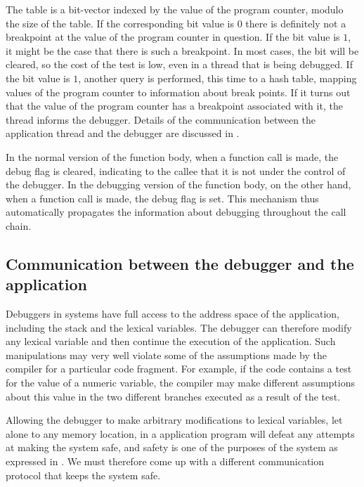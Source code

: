 The table is a bit-vector indexed by the value of the program counter,
modulo the size of the table.  If the corresponding bit value is $0$
there is definitely not a breakpoint at the value of the program
counter in question.  If the bit value is $1$, it might be the case
that there is such a breakpoint.  In most cases, the bit will be
cleared, so the cost of the test is low, even in a thread that is
being debugged.  If the bit value is $1$, another query is performed,
this time to a hash table, mapping values of the program counter to
information about break points.  If it turns out that the value of the
program counter has a breakpoint associated with it, the thread
informs the debugger.  Details of the communication between the
application thread and the debugger are discussed in
.

In the normal version of the function body, when a function call is
made, the debug flag is cleared, indicating to the callee that it is
not under the control of the debugger.  In the debugging version of
the function body, on the other hand, when a function call is
made, the debug flag is set.  This mechanism thus automatically
propagates the information about debugging throughout the call chain.

\subsection{Communication between the debugger and the application}
\label{sec-debugger-application-communication}

Debuggers in \unix{} systems have full access to the address space of
the application, including the stack and the lexical variables.  The
debugger can therefore modify any lexical variable and then continue
the execution of the application.  Such manipulations may very well
violate some of the assumptions made by the compiler for a particular
code fragment.  For example, if the code contains a test for the value
of a numeric variable, the compiler may make different assumptions
about this value in the two different branches executed as a result of
the test.

Allowing the debugger to make arbitrary modifications to lexical
variables, let alone to any memory location, in a \commonlisp{}
application program will defeat any attempts at making the system
safe, and safety is one of the purposes of the \sicl{} system as
expressed in .  We must therefore come up
with a different communication protocol that keeps the system safe.

